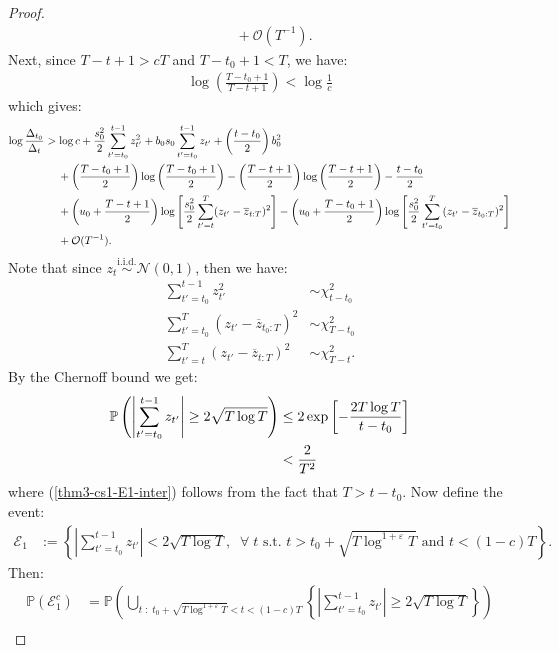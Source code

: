 \documentclass{article}
\newcommand{\sforall}{\;\forall\;}
\begin{document}
\begin{proof}
\begin{align*}
    &\quad\: + \mathcal{O}(T^{-1}).
\end{align*}
Next, since $T-t+1 > cT$ and $T-t_0+1 < T$, we have:
\begin{align*}
    \log \left(\frac{T - t_0 + 1}{T - t+1} \right) < \log \frac{1}{c} 
\end{align*}
which gives: 
\begin{align}
    \log \frac{\Delta_{t_0}}{\Delta_t} &> \log c + \frac{s_0^2}{2} \sum_{t' = t_0}^{t - 1} z_{t'}^2 + b_0 s_0 \sum_{t' = t_0}^{t - 1} z_{t'} + \left(\frac{t-t_0}{2}\right)b_0^2 \notag \\
    &\quad\: + \left(\frac{T - t_0+1}{2}\right) \log\left(\frac{T-t_0+1}{2}\right) - \left(\frac{T - t+1}{2}\right) \log\left(\frac{T-t+1}{2}\right) - \frac{t-t_0}{2} \notag\\
    &\quad\: + \left(u_0 + \frac{T - t +1}{2}\right)\log\left[ \frac{s_0^2}{2}\sum_{t'=t}^T (z_{t'} - \overline{z}_{t:T})^2 \right]  - \left(u_0 + \frac{T - t_0 +1}{2}\right)\log\left[\frac{s_0^2}{2}\sum_{t'=t_0}^T (z_{t'} - \overline{z}_{t_0:T})^2 \right] \notag\\
    &\quad\: + \mathcal{O}(T^{-1}). \label{eq:thm3-cs1-bd1}
\end{align}
Note that since $z_t \overset{\text{i.i.d.}}{\sim} \mathcal{N}(0,1)$, then we have:
\begin{align*}
    \sum_{t'=t_0}^{t-1} z^2_{t'} &\sim \chi^2_{t-t_0} \\
    \sum_{t'=t_0}^T (z_{t'} - \overline{z}_{t_0:T})^2 &\sim \chi^2_{T-t_0} \\
    \sum_{t'=t}^T (z_{t'} - \overline{z}_{t:T})^2 &\sim \chi^2_{T-t}. 
\end{align*}
By the Chernoff bound we get:
\begin{align}
    \mathbb{P}\left(\left|\sum_{t'=t_0}^{t-1} z_{t'}\right| \geq 2\sqrt{T \log T}\right) &\leq 2\exp\left[-\frac{2 T\log T}{t-t_0}\right] \notag \\
    &<  \frac{2}{T^2} \label{thm3-cs1-E1-inter}
\end{align}
where (\ref{thm3-cs1-E1-inter}) follows from the fact that $T > t-t_0$. Now define the event:
\begin{align*}
    \mathcal{E}_1 &:= \left\{\left|\sum_{t'=t_0}^{t-1} z_{t'}\right| < 2\sqrt{T \log T}, \; \sforall t \text{ s.t. } t > t_0 + \sqrt{T\log^{1+\varepsilon}T} \text{ and } t < (1-c)T\right\}.
\end{align*}
Then:
\begin{align*}
    \mathbb{P}(\mathcal{E}^c_1) &= \mathbb{P}\left(\bigcup_{t\;:\; t_0 + \sqrt{T\log^{1+\varepsilon}T} < t < (1-c)T} \left\{\left|\sum_{t'=t_0}^{t-1} z_{t'}\right| \geq 2\sqrt{T \log T}\right\}\right) \\

\end{align*}
\end{proof}
\end{document}
